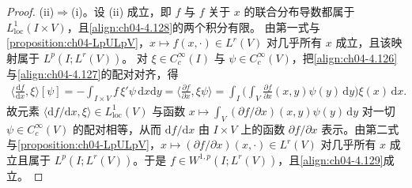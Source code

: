 \documentclass[../../main.tex]{subfiles}%
\begin{document}
\begin{proof}
(ii)$\Rightarrow$(i)。设 (ii) 成立，即 $f$ 与 $f$ 关于 $x$ 的联合分布导数都属于 $L^1_{\mathrm{loc}}(I\times V)$，且\eqref{align:ch04-4.128}的两个积分有限。
由第一式与\cref{proposition:ch04-LpULpV}，$x\mapsto f(x,\cdot)\in L^r(V)$ 对几乎所有 $x$ 成立，且该映射属于 $L^p(I;L^r(V))$。
对 $\xi\in C_c^\infty(I)$ 与 $\psi\in C_c^\infty(V)$，把\eqref{align:ch04-4.126}与\eqref{align:ch04-4.127}的配对对齐，得
\begin{align*}
\Big\langle\frac{\mathrm{d}f}{\mathrm{d}x},\xi\Big\rangle[\psi]=-\int_{I\times V}f\,\xi'\psi\,\mathrm{d}x\mathrm{d}y=\Big\langle\frac{\partial f}{\partial x},\xi\psi\Big\rangle=\int_I\Big(\int_V\frac{\partial f}{\partial x}(x,y)\psi(y)\,\mathrm{d}y\Big)\xi(x)\,\mathrm{d}x .
\end{align*}
故元素 $\langle\mathrm{d}f/\mathrm{d}x,\xi\rangle\in L^1_{\mathrm{loc}}(V)$ 与函数 $x\mapsto\int_V(\partial f/\partial x)(x,y)\psi(y)\,\mathrm{d}y$ 对一切 $\psi\in C_c^\infty(V)$ 的配对相等，从而 $\mathrm{d}f/\mathrm{d}x$ 由 $I\times V$ 上的函数 $\partial f/\partial x$ 表示。由第二式与\cref{proposition:ch04-LpULpV}，$x\mapsto(\partial f/\partial x)(x,\cdot)\in L^r(V)$ 对几乎所有 $x$ 成立且属于 $L^p(I;L^r(V))$。于是 $f\in W^{1,p}(I;L^r(V))$，且\eqref{align:ch04-4.129}成立。
\end{proof}
\end{document}

